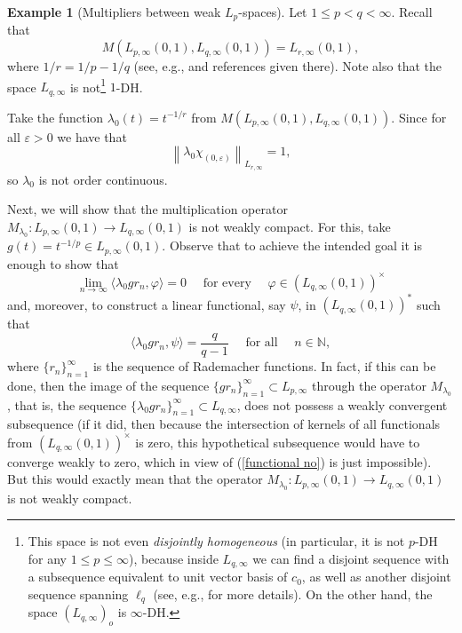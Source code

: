 \documentclass[11pt]{amsart}
\theoremstyle{definition}
\theoremstyle{definition}
\theoremstyle{definition}
\theoremstyle{definition}
\theoremstyle{definition}
\theoremstyle{definition}
\theoremstyle{definition}
\newtheorem{example}[theorem]{Example}
\theoremstyle{definition}
\numberwithin{equation}{section}
\numberwithin{equation}{section}
\numberwithin{equation}{section}
\theoremstyle{definition}
\theoremstyle{definition}
\theoremstyle{definition}
\theoremstyle{definition}
\theoremstyle{definition}
\theoremstyle{definition}
\newcommand{\norm}[1]{\left\lVert#1\right\rVert}
\begin{document}
\begin{example}[Multipliers between weak $L_p$-spaces] \label{EXP: not weakly compact between Marcinkiewicz}
	Let $1 \leqslant p < q < \infty$. Recall that
	\begin{equation*}
		M\left( L_{p,\infty}(0,1), L_{q,\infty}(0,1) \right) = L_{r,\infty}(0,1),
	\end{equation*}
	where $1/r = 1/p - 1/q$ (see, e.g., \cite[Theorem~4]{KLM19} and references given there). Note also that the space $L_{q,\infty}$ is not\footnote{This space
	is not even {\it disjointly homogeneous} (in particular, it is not $p$-DH for any $1 \leqslant p \leqslant \infty$), because inside $L_{q,\infty}$ we can find a disjoint
	sequence with a subsequence equivalent to unit vector basis of $c_0$, as well as another disjoint sequence spanning $\ell_q$ (see, e.g., \cite[Example, p.~659]{FTT09}
	for more details). On the other hand, the space $(L_{q,\infty})_o$ is $\infty$-DH.}	$1$-DH.
	
	Take the function $\lambda_0(t) = t^{-1/r}$ from $M(L_{p,\infty}(0,1), L_{q,\infty}(0,1))$. Since for all $\varepsilon > 0$ we have that
	\begin{equation*}
		\norm{\lambda_0\chi_{(0,\varepsilon)}}_{L_{r,\infty}} = 1,
	\end{equation*}
	so $\lambda_0$ is not order continuous.
	
	Next, we will show that the multiplication operator $M_{\lambda_0} \colon L_{p,\infty}(0,1) \rightarrow L_{q,\infty}(0,1)$ is not weakly compact.
	For this, take $g(t) = t^{-1/p} \in L_{p,\infty}(0,1)$. Observe that to achieve the intended goal it is enough to show that
	\begin{equation} \label{functional yes}
		\lim\limits_{n \rightarrow \infty} \langle \lambda_0 g r_n, \varphi \rangle = 0 \quad \text{ for every } \quad \varphi \in (L_{q,\infty}(0,1))^{\times}
	\end{equation}
	and, moreover, to construct a linear functional, say $\psi$, in $(L_{q,\infty}(0,1))^*$ such that
	\begin{equation} \label{functional no}
		\langle \lambda_0 g r_n, \psi \rangle = \frac{q}{q-1} \quad \text{ for all } \quad n \in \mathbb{N},
	\end{equation}
	where $\{r_n\}_{n=1}^{\infty}$ is the sequence of Rademacher functions.
	In fact, if this can be done, then the image of the sequence $\{g r_n\}_{n=1}^{\infty} \subset L_{p,\infty}$ through the operator $M_{\lambda_0}$, that is,
	the sequence $\{\lambda_0 g r_n\}_{n=1}^{\infty} \subset L_{q,\infty}$, does not possess a weakly convergent subsequence (if it did, then because the intersection
	of kernels of all functionals from $(L_{q,\infty}(0,1))^{\times}$ is zero, this hypothetical subsequence would have to converge weakly to zero, which in view of
	(\ref{functional no}) is just impossible). But this would exactly mean that the operator $M_{\lambda_0} \colon L_{p,\infty}(0,1) \rightarrow L_{q,\infty}(0,1)$
	is not weakly compact.
	

\end{example}
\end{document}
